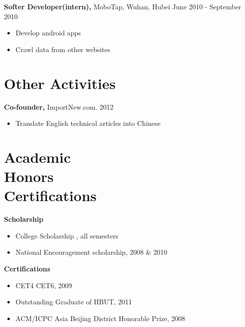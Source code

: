 \documentclass[margin]{res}
\begin{document}
\begin{resume}
{\bf Softer Developer(intern),} MoboTap, Wuhan, Hubei \hfill  June 2010 - September 2010                
                \begin{itemize} \itemsep -2pt
                 \item  Develop android apps 
                
                 \item Crawl data from other websites 

		 \end{itemize}

\section{Other Activities} 
               {\bf Co-founder,} ImportNew.com.    \hfill         2012 
                \begin{itemize} \itemsep -2pt
              \item Translate English technical articles into Chinese
		 \end{itemize}

	

\section{Academic \\ Honors \\Certifications} 
            {\bf Scholarship}
            \begin{itemize} \itemsep -2pt
              \item College Scholarship , all semesters 
              \item National Encouragement scholarship, 2008 \& 2010
            \end{itemize}

           {\bf Certifications}
           \begin{itemize}
               \item CET4 CET6, 2009
               \item Outstanding Graduate of HBUT, 2011
               \item ACM/ICPC Asia Beijing District Honorable Prize, 2008
           \end{itemize}

 


\end{resume}
\end{document}
